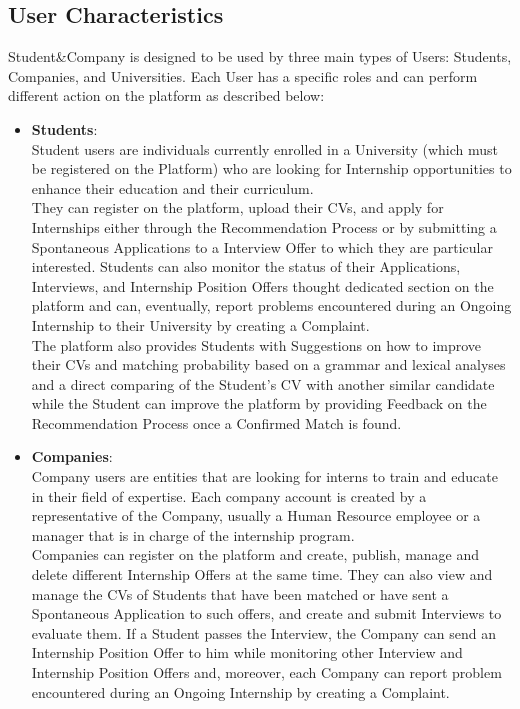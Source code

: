 \subsection{User Characteristics}
Student\&Company is designed to be used by three main types of Users: Students, Companies, and Universities. Each User has a specific roles and can perform different action on the platform as described below:
\begin{itemize}
  \item \textbf{Students}: \\
    Student users are individuals currently enrolled in a University (which must be registered on the Platform) who are looking for Internship opportunities to enhance their education and their curriculum. \\
    They can register on the platform, upload their CVs, and apply for Internships either through the Recommendation Process or by submitting a Spontaneous Applications to a Interview Offer to which they are particular interested. Students can also monitor the status of their Applications, Interviews, and Internship Position Offers thought dedicated section on the platform and can, eventually, report problems encountered during an Ongoing Internship to their University by creating a Complaint.\\
    The platform also provides Students with Suggestions on how to improve their CVs and matching probability based on a grammar and lexical analyses and a direct comparing of the Student's CV with another similar candidate while the Student can improve the platform by providing Feedback on the Recommendation Process once a Confirmed Match is found.
  \item \textbf{Companies}:\\
    Company users are entities that are looking for interns to train and educate in their field of expertise. Each company account is created by a representative of the Company, usually a Human Resource employee or a manager that is in charge of the internship program. \\
    Companies can register on the platform and create, publish, manage and delete different Internship Offers at the same time. They can also view and manage the CVs of Students that have been matched or have sent a Spontaneous Application to such offers, and create and submit Interviews to evaluate them. If a Student passes the Interview, the Company can send an Internship Position Offer to him while monitoring other Interview and Internship Position Offers and, moreover, each Company can report problem encountered during an Ongoing Internship by creating a Complaint.\\

\end{itemize}
